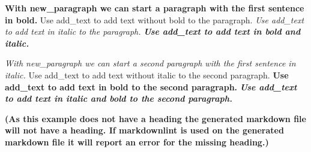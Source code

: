\documentclass[a4paper]{report}
\begin{document}
\textbf{With new\_paragraph we can start a paragraph with the first sentence in bold.} Use add\_text to add text without bold to the paragraph.\textit{ Use add\_text to add text in italic to the paragraph.}\textit{\textbf{ Use add\_text to add text in bold and italic.}}

\textit{With new\_paragraph we can start a second paragraph with the first sentence in italic.} Use add\_text to add text without italic to the second paragraph.\textbf{ Use add\_text to add text in bold to the second paragraph.}\textit{\textbf{ Use add\_text to add text in italic and bold to the second paragraph.}}

\textbf{(As this example does not have a heading the generated markdown file will not have a heading. If markdownlint is used on the generated markdown file it will report an error for the missing heading.)}
\end{document}
